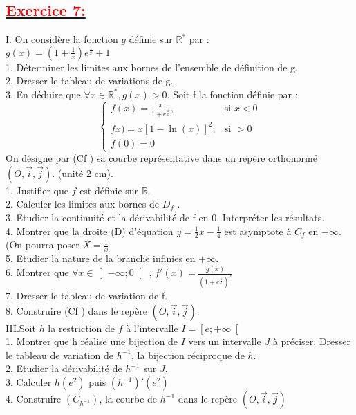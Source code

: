 \documentclass[12pt]{article}
\begin{document}
\subsection*{\underline{\textbf{\textcolor{red}{Exercice 7:}}}}
I. On considère la fonction $g$ définie sur $\mathbb{R}^{*}$ par :\\
$g(x)=(1+\frac{1}{x})e^{\frac{1}{x}}+1$\\
1. Déterminer les limites aux bornes de l’ensemble de définition de g.\\
2. Dresser le tableau de variations de g.\\
3. En déduire que $\forall x \in \mathbb{R}^{*}, g(x)>0.$
Soit f la fonction définie par :\\
\[ \begin{cases} 
  f(x)=\frac{x}{1+e^{\frac{1}{x}}}, & \text{si } x < 0 \\
  fx)=x[1-\ln(x)]^{2}, & \text{si } > 0 \\
  f(0)=0
\end{cases} \]
On désigne par (Cf ) sa courbe représentative dans un repère orthonormé 
$(O,\vec{i},\vec{j})$. (unité 2 cm).\\
1. Justifier que $f$ est définie sur $\mathbb{R}$.\\
2. Calculer les limites aux bornes de $D_{f}$ .\\
3. Etudier la continuité et la dérivabilité de f en 0. Interpréter les résultats.\\
4. Montrer que la droite (D) d’équation $y=\frac{1}{2}x-\frac{1}{4}$ est asymptote à $C_{f}$ en $-\infty$. (On pourra poser $X=\frac{1}{x}$\\
5. Etudier la nature de la branche infinies en $+\infty$.\\
6. Montrer que $\forall x \in \left] -\infty; 0\right[$ , $f'(x)=\frac{g(x)}{(1+e^{\frac{1}{x}})^{2}}$\\
7. Dresser le tableau de variation de f.\\
8. Construire (Cf ) dans le repère $(O,\vec{i},\vec{j})$.\\
III.Soit $h$ la restriction de $f$ à l’intervalle $I=\left[ e;+\infty\right[ $\\
1. Montrer que h réalise une bijection de $I$ vers un intervalle $J$ à préciser. Dresser le tableau de variation de $h^{-1}$, la bijection réciproque de $h$.\\
2. Etudier la dérivabilité de $h^{-1}$ sur $J$.\\
3. Calculer $h(e^{2})$ puis $(h^{-1})'(e^{2})$\\
4. Construire $(C_{h^{-1}})$, la courbe de $h^{-1}$ dans le repère $(O,\vec{i},\vec{j})$\\
\end{document}

